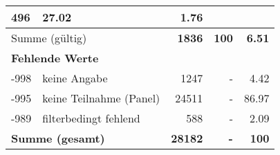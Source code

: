 \begin{longtable}{lXrrr}
       \num{496} &
       \num[round-mode=places,round-precision=2]{27,02} &
         \num[round-mode=places,round-precision=2]{1,76} \\
     \midrule
     \multicolumn{2}{l}{Summe (gültig)} &
       \textbf{\num{1836}} &
     \textbf{100} &
       \textbf{\num[round-mode=places,round-precision=2]{6,51}} \\
     \multicolumn{5}{l}{\textbf{Fehlende Werte}}\\
       -998 &
       keine Angabe &
         \num{1247} &
        - &
         \num[round-mode=places,round-precision=2]{4,42} \\
       -995 &
       keine Teilnahme (Panel) &
         \num{24511} &
        - &
         \num[round-mode=places,round-precision=2]{86,97} \\
       -989 &
       filterbedingt fehlend &
         \num{588} &
        - &
         \num[round-mode=places,round-precision=2]{2,09} \\
     \midrule
     \multicolumn{2}{l}{\textbf{Summe (gesamt)}} &
          \textbf{\num{28182}} &
        \textbf{-} &
        \textbf{100} \\
     \bottomrule
     \end{longtable}
     
